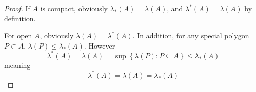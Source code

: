 \begin{proof}
	If $A$ is compact, obviously $\lambda_*(A) = \lambda(A)$, and $\lambda^*(A) = \lambda(A)$ by definition.
	
	For open $A$, obviously $\lambda(A)=\lambda^*(A)$. In addition, for any special polygon $P \subset A$, $\lambda(P) \leq \lambda_*(A)$. However
	$$\lambda^*(A)  = \lambda(A) = \sup \left\{ \lambda(P) : P\subseteq A \right\} \leq \lambda_*(A)$$
	meaning
	$$\lambda^*(A)  = \lambda(A) =  \lambda_*(A)$$
\end{proof}